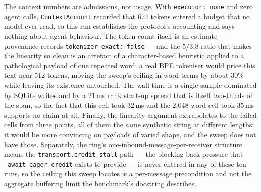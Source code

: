 \documentclass[11pt]{article}
\begin{document}
The context numbers are admissions, not usage. With \texttt{executor: none} and zero
agent calls, \texttt{ContextAccount} recorded that 674 tokens entered a budget that
no model ever read, so this run establishes the protocol's accounting and says
nothing about agent behaviour. The token count itself is an estimate --- provenance
records \texttt{tokenizer\_exact: false} --- and the $5/3.8$ ratio that makes the
linearity so clean is an artefact of a character-based heuristic applied to a
pathological payload of one repeated word; a real BPE tokeniser would price this text
near 512 tokens, moving the sweep's ceiling in word terms by about 30\% while leaving
its existence untouched. The wall time is a single sample dominated by SQLite writes
and by a 21\,ms rank start-up spread that is itself two-thirds of the span, so the
fact that this cell took 32\,ms and the 2{,}048-word cell took 35\,ms supports no
claim at all. Finally, the linearity argument extrapolates to the failed cells from
three points, all of them the same synthetic string at different lengths; it would be
more convincing on payloads of varied shape, and the sweep does not have those.
Separately, the ring's one-inbound-message-per-receiver structure means the
\texttt{transport.credit\_stall} path --- the blocking back-pressure that
\texttt{\_await\_eager\_credit} exists to provide --- is never entered in any of these
ten runs, so the ceiling this sweep locates is a per-message precondition and not
the aggregate buffering limit the benchmark's docstring describes.
\end{document}
